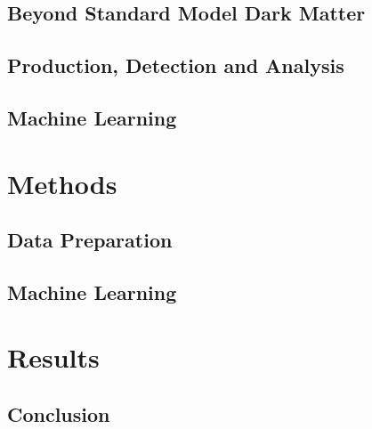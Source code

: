 \documentclass[12pt, a4paper]{book}
\begin{document}
\chapter{Beyond Standard Model Dark Matter}\label{chap:DM}


\chapter{Production, Detection and Analysis}\label{chap:CERN_method}


\chapter{Machine Learning}\label{chap:theo_ML}



\part{Methods}


\chapter{Data Preparation}\label{chap:data_prep}


\chapter{Machine Learning}\label{chap:ML}


\part{Results}


% 
% 

\chapter{Conclusion}\label{chap:conclusion}

\end{document}
